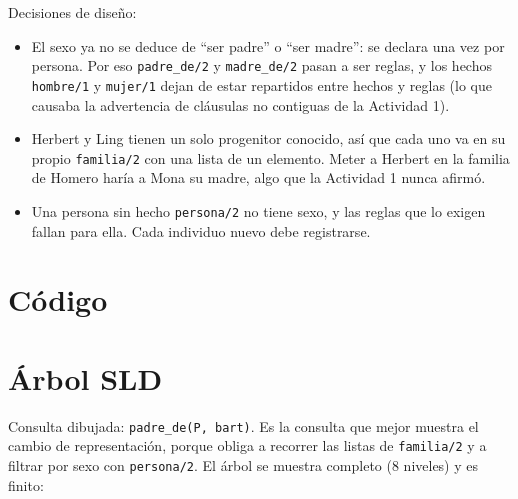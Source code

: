 \documentclass[12pt]{report}
\begin{document}
Decisiones de diseño:

\begin{itemize}
    \item El sexo ya no se deduce de ``ser padre'' o ``ser madre'': se
          declara una vez por persona. Por eso \texttt{padre\_de/2} y
          \texttt{madre\_de/2} pasan a ser reglas, y los hechos
          \texttt{hombre/1} y \texttt{mujer/1} dejan de estar repartidos
          entre hechos y reglas (lo que causaba la advertencia de cláusulas
          no contiguas de la Actividad 1).
    \item Herbert y Ling tienen un solo progenitor conocido, así que cada
          uno va en su propio \texttt{familia/2} con una lista de un
          elemento. Meter a Herbert en la familia de Homero haría a Mona su
          madre, algo que la Actividad 1 nunca afirmó.
    \item Una persona sin hecho \texttt{persona/2} no tiene sexo, y las reglas
          que lo exigen fallan para ella. Cada individuo nuevo debe
          registrarse.
\end{itemize}

\section{Código}



\section{Árbol SLD}

Consulta dibujada: \texttt{padre\_de(P, bart)}. Es la consulta que mejor
muestra el cambio de representación, porque obliga a recorrer las listas de
\texttt{familia/2} y a filtrar por sexo con \texttt{persona/2}. El árbol se
muestra completo (8 niveles) y es finito:
\end{document}
